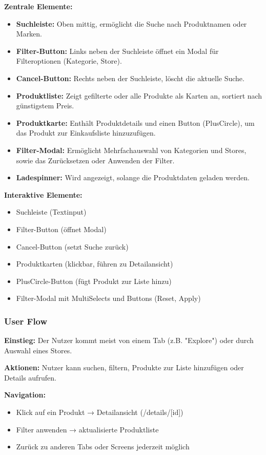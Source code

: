 \documentclass[12pt, a4paper]{report} %
\begin{document}
\textbf{Zentrale Elemente:}
\begin{itemize}
    \item \textbf{Suchleiste:} Oben mittig, ermöglicht die Suche nach Produktnamen oder Marken.
    \item \textbf{Filter-Button:} Links neben der Suchleiste öffnet ein Modal für Filteroptionen (Kategorie, Store).
    \item \textbf{Cancel-Button:} Rechts neben der Suchleiste, löscht die aktuelle Suche.
    \item \textbf{Produktliste:} Zeigt gefilterte oder alle Produkte als Karten an, sortiert nach günstigstem Preis.
    \item \textbf{Produktkarte:} Enthält Produktdetails und einen Button (PlusCircle), um das Produkt zur Einkaufsliste hinzuzufügen.
    \item \textbf{Filter-Modal:} Ermöglicht Mehrfachauswahl von Kategorien und Stores, sowie das Zurücksetzen oder Anwenden der Filter.
    \item \textbf{Ladespinner:} Wird angezeigt, solange die Produktdaten geladen werden.
\end{itemize}

\noindent\textbf{Interaktive Elemente:}
\begin{itemize}
    \item Suchleiste (Textinput)
    \item Filter-Button (öffnet Modal)
    \item Cancel-Button (setzt Suche zurück)
    \item Produktkarten (klickbar, führen zu Detailansicht)
    \item PlusCircle-Button (fügt Produkt zur Liste hinzu)
    \item Filter-Modal mit MultiSelects und Buttons (Reset, Apply)
\end{itemize}

\subsubsection{User Flow}
\textbf{Einstieg:} Der Nutzer kommt meist von einem Tab (z.B. "Explore") oder durch Auswahl eines Stores.

\noindent\textbf{Aktionen:} Nutzer kann suchen, filtern, Produkte zur Liste hinzufügen oder Details aufrufen.

\noindent\textbf{Navigation:}
\begin{itemize}
    \item Klick auf ein Produkt → Detailansicht (/details/[id])
    \item Filter anwenden → aktualisierte Produktliste
    \item Zurück zu anderen Tabs oder Screens jederzeit möglich
\end{itemize}
\end{document}
